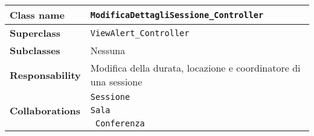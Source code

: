 \begin{table}[h!]
	\begin{tabular}{|l|l|}
		\hline 
		\textbf{Class name} & \texttt{ModificaDettagliSessione\_Controller}
		\\ \hline
		\textbf{Superclass} & \texttt{ViewAlert\_Controller}
		\\ \hline
		\multirow{1}{*}{\textbf{Subclasses}} & Nessuna
		\\ \hline
		\textbf{Responsability} & Modifica della durata, locazione e coordinatore di una sessione
		\\ \hline
		\multirow{3}{*}{\textbf{Collaborations}} & \texttt{Sessione} \\
		& \texttt{Sala} \\
		&\texttt{ Conferenza}
		\\ \hline
	\end{tabular}
\end{table}

